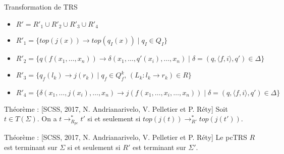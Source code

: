 \begin{frame}{Transformation de TRS}
  \begin{itemize}
  \item $R' = R'_1 \cup R'_2 \cup R'_3 \cup R'_4$
  \item $R'_1 = \{top(j(x)) \rightarrow top(q_I(x)) \mid q_I \in Q_I\}$
  \item $R'_2= \{q(f(x_1,\ldots,x_n))\rightarrow \delta(x_1,\ldots,q'(x_i),\ldots,x_n) \mid \delta=(q, \langle f,i \rangle, q') \in \Delta\}$
  \item $R'_3= \{q_f(l_k) \rightarrow j(r_k) \mid q_f \in Q_f^k,\, (L_k : l_k \rightarrow r_k) \in R\}$
  \item $R'_4= \{\delta(x_1,\ldots,j(x_i),\ldots,x_n)\rightarrow j(f(x_1,\ldots,x_i,\ldots,x_n)) \mid \delta=(q, \langle f,i \rangle, q') \in \Delta\}$
  \end{itemize}
  \begin{alertblock}{Théorème : {\small[SCSS, 2017, N. Andrianarivelo, V. Pelletier et P. Réty]}}
    Soit $t \in T(\Sigma)$. On a $t \rightarrow^*_{R_{pc}} t'$ si et seulement si $top(j(t)) \rightarrow^*_{R'} top(j(t'))$.
  \end{alertblock}
  \begin{alertblock}{Théorème : {\small[SCSS, 2017, N. Andrianarivelo, V. Pelletier et P. Réty]}}
    Le pcTRS $R$ est terminant sur $\Sigma$ si et seulement si $R'$ est terminant sur $\Sigma'$.
  \end{alertblock}
\end{frame}

